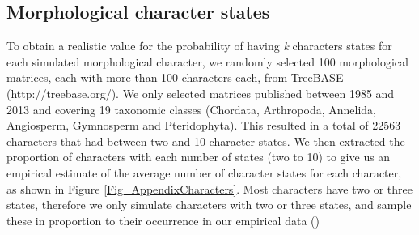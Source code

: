 
\subsection{Morphological character states}
To obtain a realistic value for the probability of having \textit{k} characters states for each simulated morphological character, we randomly selected 100 morphological matrices, each with more than 100 characters each, from TreeBASE (http://treebase.org/). We only selected matrices published between 1985 and 2013 and covering 19 taxonomic classes (Chordata, Arthropoda, Annelida, Angiosperm, Gymnosperm and Pteridophyta). This resulted in a total of 22563 characters that had between two and 10 character states. We then extracted the proportion of characters with each number of states (two to 10) to give us an empirical estimate of the average number of character states for each character, as shown in Figure \ref{Fig_AppendixCharacters}. Most characters have two or three states, therefore we only simulate characters with two or three states, and sample these in proportion to their occurrence in our empirical data ()%



